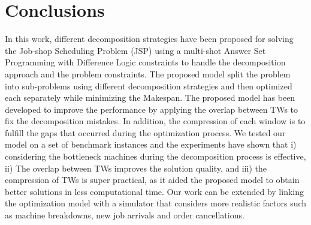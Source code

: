 \documentclass{tlp} %
\begin{document}
\section{Conclusions}\label{sec:conclusions}
In this work, different decomposition strategies have been proposed for solving the Job-shop Scheduling Problem (JSP) using a multi-shot Answer Set Programming with Difference Logic constraints to handle the decomposition approach and the problem constraints. The proposed model split the problem into sub-problems using different decomposition strategies and then optimized each separately while minimizing the Makespan. The proposed model has been developed to improve the performance by applying the overlap between TWs to fix the decomposition mistakes. In addition, the compression of each window is to fulfill the gaps that occurred during the optimization process. We tested our model on a set of benchmark instances and the experiments have shown that i) considering the bottleneck machines during the decomposition process is effective, ii) The overlap between TWs improves the solution quality, and iii) the compression of TWs is super practical, as it aided the proposed model to obtain better solutions in less computational time. Our work can be extended by linking the optimization model with a simulator that considers more realistic factors such as machine breakdowns, new job arrivals and order cancellations.

%
%
%
% 
% 
%

\end{document}
